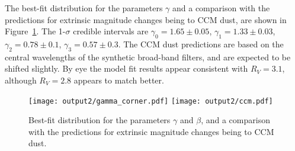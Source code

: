 \documentclass[11pt, oneside]{article}   	%
\begin{document}
The best-fit distribution for the parameters $\gamma$  and a comparison with the predictions for extrinsic
magnitude changes being to CCM dust, are shown in Figure~\ref{gamma:fig}.  The 1-$\sigma$ 
credible intervals are $\gamma_0=1.65 \pm 0.05$,
$\gamma_1 = 1.33  \pm 0.03$, $\gamma_2 = 0.78  \pm 0.1$, $\gamma_3 = 0.57  \pm 0.3$.
The CCM dust predictions are based 
on the central wavelengths of the synthetic broad-band filters, and are expected to be shifted slightly.
By eye the model fit results appear consistent with $R_V=3.1$, although $R_V=2.8$ appears to match better.
\begin{figure}[htbp] %
   \centering
   \texttt{[image: output2/gamma\_corner.pdf]} 
   \texttt{[image: output2/ccm.pdf]} 
   \caption{Best-fit distribution for the parameters $\gamma$ and $\beta$, and a comparison with the predictions for extrinsic
magnitude changes being to CCM dust.}
   \label{gamma:fig}
\end{figure}
\end{document}
